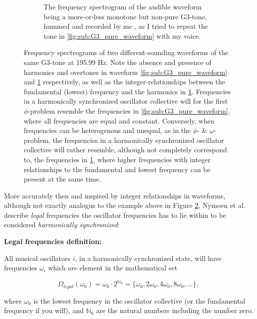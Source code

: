 \begin{figure}[ht!]
\begin{subfigure}[t]{.5\textwidth}
		\caption{The frequency spectrogram of the audible waveform being a more-or-less monotone but non-pure G3-tone, hummed and recorded by me \cite{}, as I tried to repeat the tone in \ref{fig:sub:G3_pure_waveform} with my voice.}
		\label{fig:sub:G3_hummed_waveform}
	\end{subfigure}
	\caption[Frequency spectrograms illustrating the absence and presence of harmonics and overtones in audible waveforms]{Frequency spectrograms of two different-sounding waveforms of the same G3-tone at 195.99 Hz. Note the absence and presence of harmonics and overtones in waveform \ref{fig:sub:G3_pure_waveform} and \ref{fig:sub:G3_hummed_waveform} respectively, as well as the integer-relationships between the fundamental (lowest) frequency and the harmonics in \ref{fig:sub:G3_hummed_waveform}. Frequencies in a harmonically synchronized oscillator collective will for the first $\phi$-problem resemble the frequencies in \ref{fig:sub:G3_pure_waveform}, where all frequencies are equal and constant. Conversely, when frequencies can be heterogenous and unequal, as in the $\phi$- \& $\omega$-problem, the frequencies in a harmonically synchronized oscillator collective will rather resemble, although not completely correspond to, the frequencies in \ref{fig:sub:G3_hummed_waveform}, where higher frequencies with integer relationships to the fundamental and lowest frequency can be present at the same time.}
	\label{fig:frequency_spectrograms}
\end{figure}

More accurately then and inspired by integer relationships in waveforms, although not exactly analogus to the example above in Figure \ref{fig:frequency_spectrograms}, Nymoen et al. describe \textit{legal} frequencies the oscillator frequencies has to lie within to be considered \textit{harmonically synchronized}: \nl

\textbf{Legal frequencies definition:} \nl

All musical oscillators $i$, in a harmonically synchronized state, will have frequencies $\omega_i$ which are element in the mathematical set

\begin{equation}\label{legal_freqs}
\Omega_{legal}(\omega_0) = \omega_{0} \cdot 2^{\mathbb{N}_0} = \{\omega_{0}, 2\omega_{0}, 4\omega_{0}, 8\omega_{0}, ...\} ,
\end{equation}

where $\omega_{0}$ is the lowest frequency in the oscillator collective (or the fundamental frequency if you will), and $\mathbb{N}_0$ are the natural numbers including the number zero. \nl

